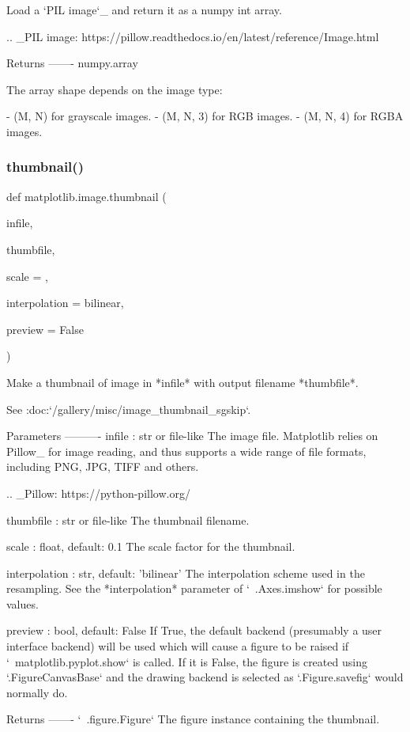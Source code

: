 \begin{DoxyVerb}Load a `PIL image`_ and return it as a numpy int array.

.. _PIL image: https://pillow.readthedocs.io/en/latest/reference/Image.html

Returns
-------
numpy.array

    The array shape depends on the image type:

    - (M, N) for grayscale images.
    - (M, N, 3) for RGB images.
    - (M, N, 4) for RGBA images.
\end{DoxyVerb}
 \mbox{\label{namespacematplotlib_1_1image_a7d35eeb8c37e2a731eed617339d3d831}} 
\subsubsection{\texorpdfstring{thumbnail()}{thumbnail()}}
{\footnotesize\ttfamily def matplotlib.\+image.\+thumbnail (\begin{DoxyParamCaption}\item[{}]{infile,  }\item[{}]{thumbfile,  }\item[{}]{scale = {},  }\item[{}]{interpolation = {\ttfamily \textquotesingle{}bilinear\textquotesingle{}},  }\item[{}]{preview = {\ttfamily False} }\end{DoxyParamCaption})}

\begin{DoxyVerb}Make a thumbnail of image in *infile* with output filename *thumbfile*.

See :doc:`/gallery/misc/image_thumbnail_sgskip`.

Parameters
----------
infile : str or file-like
    The image file. Matplotlib relies on Pillow_ for image reading, and
    thus supports a wide range of file formats, including PNG, JPG, TIFF
    and others.

    .. _Pillow: https://python-pillow.org/

thumbfile : str or file-like
    The thumbnail filename.

scale : float, default: 0.1
    The scale factor for the thumbnail.

interpolation : str, default: 'bilinear'
    The interpolation scheme used in the resampling. See the
    *interpolation* parameter of `~.Axes.imshow` for possible values.

preview : bool, default: False
    If True, the default backend (presumably a user interface
    backend) will be used which will cause a figure to be raised if
    `~matplotlib.pyplot.show` is called.  If it is False, the figure is
    created using `.FigureCanvasBase` and the drawing backend is selected
    as `.Figure.savefig` would normally do.

Returns
-------
`~.figure.Figure`
    The figure instance containing the thumbnail.
\end{DoxyVerb}
 

